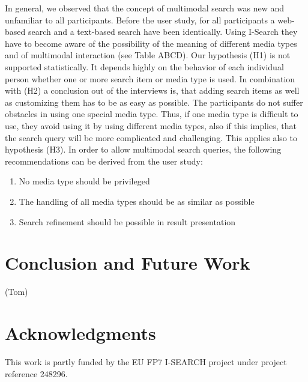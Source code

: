 \documentclass[runningheads,a4paper]{llncs} \usepackage[utf8]{inputenc}
\begin{document}
In general, we observed that the concept of multimodal search was new and
unfamiliar to all participants. Before the user study, for all participants a
web-based search and a text-based search have been identically. Using I-Search
they have to become aware of the possibility of the meaning of different media
types and of multimodal interaction (see Table ABCD). Our hypothesis (H1) is not
supported statistically. It depends highly on the behavior of each individual
person whether one or more search item or media type is used. In combination
with (H2) a conclusion out of the interviews is, that adding search items as
well as customizing them has to be as easy as possible. The participants do not
suffer obstacles in using one special media type. Thus, if one media type is
difficult to use, they avoid using it by using different media types, also if
this implies, that the search query will be more complicated and challenging.
This applies also to hypothesis (H3). In order to allow multimodal search
queries, the following recommendations can be derived from the user study: 

\begin{enumerate}
  \item No media type should be privileged
  \item The handling of all media types should be as similar as possible
  \item Search refinement should be possible in result presentation  
\end{enumerate}

\section{Conclusion and Future Work}
(Tom)

\section{Acknowledgments}
This work is partly funded by the EU FP7 \mbox{I-SEARCH} project under project reference 248296.



\end{document}

